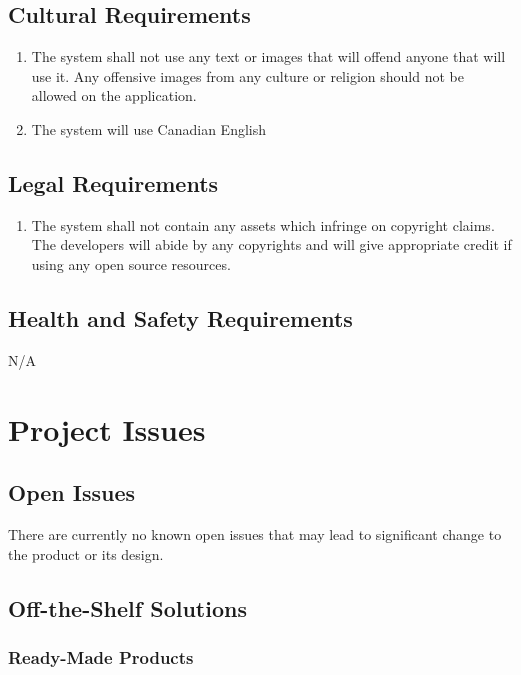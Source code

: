 \documentclass[12pt]{article}
\begin{document}
\subsection{Cultural Requirements}
\begin{enumerate}[CR\arabic*.]
	\item The system shall not use any text or images that will offend anyone that will use it. Any offensive
	      images from any culture or religion should not be allowed on the application.
	\item The system will use Canadian English
\end{enumerate}

\subsection{Legal Requirements}
\begin{enumerate}[LR\arabic*.]
	\item The system shall not contain any assets which infringe on copyright claims. The developers will
	      abide by any copyrights and will give appropriate credit if using any open source resources.
\end{enumerate}

\subsection{Health and Safety Requirements}
N/A

\section{Project Issues}

\subsection{Open Issues}

There are currently no known open issues that may lead to significant change to the product or its
design.

\subsection{Off-the-Shelf Solutions}

\subsubsection{Ready-Made Products}
\end{document}
